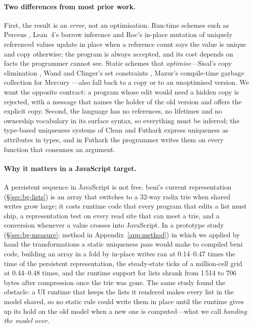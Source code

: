 \paragraph{Two differences from most prior work.} First, the result is an \emph{error}, not an
optimisation. Run-time schemes such as Perceus \citep{reinking2021perceus}, Lean~4's borrow inference
\citep{ullrich2019beans} and Roc's in-place mutation of uniquely referenced values
\citep{teeuwissen2023roc} update in place when a reference count says the value is unique and copy
otherwise; the program is always accepted, and its cost depends on facts the programmer cannot see.
Static schemes that \emph{optimise}---Sisal's copy elimination \citep{cann1990sisal}, Wand and
Clinger's set constraints \citep{wand2001set}, Mazur's compile-time garbage collection for Mercury
\citep{mazur2004thesis}---also fall back to a copy or to an unoptimised version. We want the opposite
contract: a program whose edit would need a hidden copy is rejected, with a message that names the
holder of the old version and offers the explicit copy. Second, the language has no references, no
lifetimes and no ownership vocabulary in its surface syntax, so everything must be inferred; the
type-based uniqueness systems of Clean \citep{barendsen1996uniqueness,plasmeijer2011clean} and Futhark
\citep{henriksen2017futhark} express uniqueness as attributes in types, and in Futhark the programmer
writes them on every function that consumes an argument.

\paragraph{Why it matters in a JavaScript target.}
A persistent sequence in JavaScript is not free. beni's current representation (\S\ref{sec:bg-lists})
is an array that switches to a 32-way radix trie when shared writes grow large; it costs runtime code
that every program that edits a list must ship, a representation test on every read site that can
meet a trie, and a conversion whenever a value crosses into JavaScript. In a prototype study
(\S\ref{sec:bg-measure}; method in Appendix~\ref{app:method}) in which we applied by hand the
transformations a static uniqueness pass would make to compiled beni code, building an array in a
fold by in-place writes ran at 0.14--0.47 times the time of the persistent representation, the
steady-state ticks of a million-cell grid at 0.44--0.48 times, and the runtime support for lists
shrank from 1\,514 to 706 bytes after compression once the trie was gone. The same study found the
obstacle: a UI runtime that keeps the lists it rendered makes every list in the model shared, so no
static rule could write them in place until the runtime gives up its hold on the old model when a new
one is computed---what we call \emph{handing the model over}.


